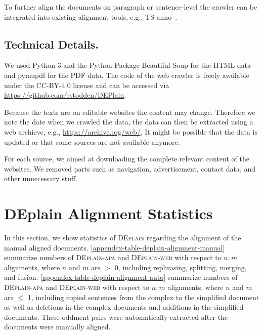 \documentclass[11pt]{article}
\begin{document}
To further align the documents on paragraph or sentence-level the crawler can be integrated into existing alignment tools, e.g., TS-anno~\cite{stodden-kallmeyer-2022-ts}. \par 


\subsection{Technical Details.}
We used Python 3 and the Python Package Beautiful Soup for the HTML data and pymupdf for the PDF data. The code of the web crawler is freely available under the CC-BY-4.0 license and can be accessed via \url{https://github.com/rstodden/DEPlain}.



Because the texts are on editable websites the content may change. Therefore we note the date when we crawled the data, the data can then be extracted using a web archieve, e.g., \url{https://archive.org/web/}. It might be possible that the data is updated or that some sources are not available anymore. 

For each source, we aimed at downloading the complete relevant content of the websites. We removed parts such as navigation, advertisement, contact data, and other unnecessary stuff.

\section{DEplain Alignment Statistics}
\label{appendix-deplain-statistics}
In this section, we show statistics of \textsc{DEplain} regarding the alignment of the manual aligned documents. \autoref{appendex-table-deplain-alignment-manual} summarize numbers of \textsc{DEplain-apa} and \textsc{DEplain-web} with respect to $n:m$ alignments, where $n$ and $m$ are $>$ 0, including rephrasing, splitting, merging, and fusion. \autoref{appendex-table-deplain-alignment-auto} summarize numbers of \textsc{DEplain-apa} and \textsc{DEplain-web} with respect to $n:m$ alignments, where $n$ and $m$ are $\leq$ 1, including copied sentences from the complex to the simplified document as well as deletions in the complex documents and additions in the simplified documents. These oddment pairs were automatically extracted after the documents were manually aligned.
\end{document}
